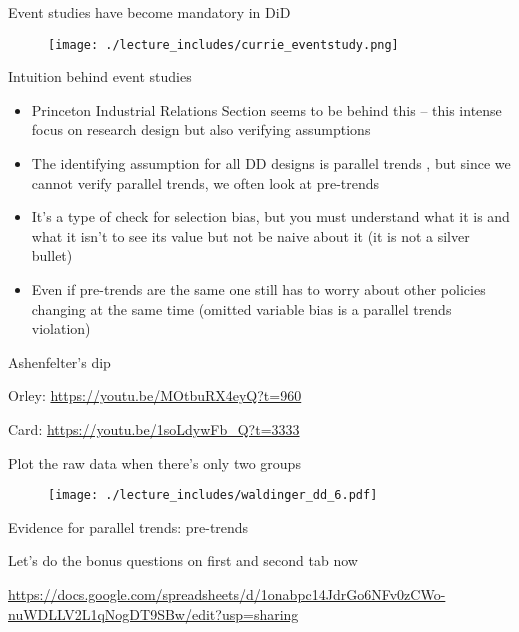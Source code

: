 \documentclass{beamer}
\begin{document}
\begin{frame}{Event studies have become mandatory in DiD}

	\begin{figure}
	\texttt{[image: ./lecture\_includes/currie\_eventstudy.png]}
	\end{figure}

\end{frame}

\begin{frame}{Intuition behind event studies}

\begin{itemize}
	\item Princeton Industrial Relations Section seems to be behind this -- this intense focus on research design but also verifying assumptions
	\item The identifying assumption for all DD designs is parallel trends , but since we cannot verify parallel trends, we often look at pre-trends
	\item It's a type of check for selection bias, but you must understand what it is and what it isn't to see its value but not be naive about it (it is not a silver bullet)
	\item Even if pre-trends are the same one still has to worry about other policies changing at the same time (omitted variable bias is a parallel trends violation)

\end{itemize}

\end{frame}

\begin{frame}{Ashenfelter's dip}

Orley: \url{https://youtu.be/MOtbuRX4eyQ?t=960}

Card: \url{https://youtu.be/1soLdywFb_Q?t=3333}

\end{frame}




\begin{frame}{Plot the raw data when there's only two groups}

	\begin{figure}
	\texttt{[image: ./lecture\_includes/waldinger\_dd\_6.pdf]}
	\end{figure}

\end{frame}

\begin{frame}{Evidence for parallel trends: pre-trends}

Let's do the bonus questions on first and second tab now 

\url{https://docs.google.com/spreadsheets/d/1onabpc14JdrGo6NFv0zCWo-nuWDLLV2L1qNogDT9SBw/edit?usp=sharing}

\end{frame}
\end{document}
